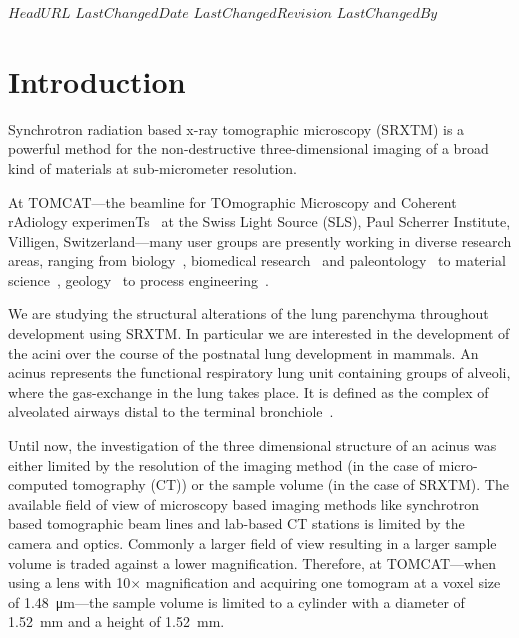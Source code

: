 \svnidlong
{$HeadURL$}
{$LastChangedDate$}
{$LastChangedRevision$}
{$LastChangedBy$}
%
%
\section{Introduction}

Synchrotron radiation based x-ray tomographic microscopy (SRXTM) is a powerful method for the non-destructive three-dimensional imaging of a broad kind of materials at sub-micrometer resolution.

At TOMCAT---the beamline for TOmographic Microscopy and Coherent rAdiology experimenTs~\cite{Stampanoni2007} at the Swiss Light Source (SLS), Paul Scherrer Institute, Villigen, Switzerland---many user groups are presently working in diverse research areas, ranging from biology~\cite{McDonald2009,PerezHuerta2009}, biomedical research~\cite{Schittny2008,Tsuda2008,Heinzer2008} and paleontology~\cite{Gostling2008,Friis2007,Hagadorn2006,Donoghue2006} to material science~\cite{Gallucci2007}, geology~\cite{Carminati2007} to process engineering~\cite{Davenport2007,Vaucher2007}.

We are studying the structural alterations of the lung parenchyma throughout development using SRXTM. In particular we are interested in the development of the acini over the course of the postnatal lung development in mammals. An acinus represents the functional respiratory lung unit containing groups of alveoli, where the gas-exchange in the lung takes place. It is defined as the complex of alveolated airways distal to the terminal bronchiole~\cite{Rodriguez1987}.

Until now, the investigation of the three dimensional structure of an acinus was either limited by the resolution of the imaging method (in the case of micro-computed tomography (\micro CT)) or the sample volume (in the case of SRXTM). The available field of view of microscopy based imaging methods like synchrotron based tomographic beam lines and lab-based \micro CT stations is limited by the camera and optics. Commonly a larger field of view resulting in a larger sample volume is traded against a lower magnification. Therefore, at TOMCAT---when using a lens with 10$\times$ magnification and acquiring one tomogram at a voxel size of \SI{1.48}{\micro\meter}---the sample volume is limited to a cylinder with a diameter of \SI{1.52}{\milli\meter} and a height of \SI{1.52}{\milli\meter}.

